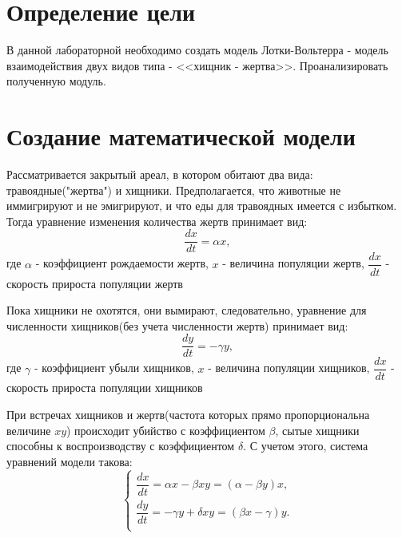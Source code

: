 \documentclass[a4paper, 14pt]{extarticle}
\begin{document}
	\pagebreak	

	\section{Определение цели}
		В данной лабораторной необходимо создать модель Лотки-Вольтерра - модель взаимодействия двух видов типа - <<хищник - жертва>>.
		Проанализировать полученную модуль.

	\section{Создание математической модели}
		Рассматривается закрытый ареал, в котором обитают два вида: травоядные("жертва") и хищники. Предполагается, что животные не иммигрируют и не эмигрируют, и
		что еды для травоядных имеется с избытком. Тогда уравнение изменения количества жертв принимает вид:
			\[ \dfrac{dx}{dt} = \alpha x,\]
		где $\alpha$ - коэффициент рождаемости жертв, $x$ - величина популяции жертв, $\dfrac{dx}{dt}$ - скорость прироста популяции жертв

		Пока хищники не охотятся, они вымирают, следовательно, уравнение для численности хищников(без учета численности жертв) принимает вид:
			\[ \dfrac{dy}{dt} = -\gamma y,\]
		где $\gamma$ - коэффициент убыли хищников, $x$ - величина популяции хищников, $\dfrac{dx}{dt}$ - скорость прироста популяции хищников

		При встречах хищников и жертв(частота которых прямо пропорциональна величине $xy$) происходит убийство с коэффициентом $\beta$, сытые хищники способны к воспроизводству с коэффициентом $\delta$.
		С учетом этого, система уравнений модели такова:
		\[ \begin{cases}
			\dfrac{dx}{dt} = \alpha x - \beta xy = (\alpha - \beta y)x, \\
			\dfrac{dy}{dt} = - \gamma y + \delta xy = (\beta x - \gamma)y. \\
		    \end{cases}
		 \]
	
\end{document}
